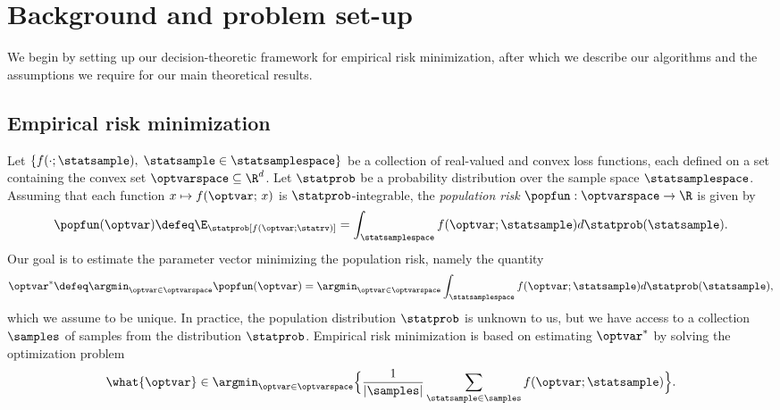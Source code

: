 \documentclass[11pt,twoside]{article}
\theoremstyle{definition}
\newcommand{\MYMIN}[1]{\ensuremath{\Big\{#1 \Big \}}}
\begin{document}




\section{Background and problem set-up}

We begin by setting up our decision-theoretic framework for empirical
risk minimization, after which we describe our algorithms and the
assumptions we require for our main theoretical results.

\subsection{Empirical risk minimization}

Let $\{f(\cdot; \statsample), \; \statsample \in \statsamplespace\}$
be a collection of real-valued and convex loss functions, each defined
on a set containing the convex set $\optvarspace \subseteq \R^d$. Let
$\statprob$ be a probability distribution over the sample space
$\statsamplespace$.  Assuming that each function $x \mapsto f(\optvar;
\, x)$ is $\statprob$-integrable, the \emph{population risk} $\popfun
: \optvarspace \rightarrow \R$ is given by
\begin{equation}
  \label{eqn:objective}
  \popfun(\optvar) \defeq \E_\statprob[f(\optvar; \statrv)] =
  \int_{\statsamplespace} f(\optvar; \statsample) d
  \statprob(\statsample).
\end{equation}
Our goal is to estimate the parameter vector minimizing the population
risk, namely the quantity
\begin{equation}
  \label{eqn:optimal-point}
  \optvar^* \defeq
  \argmin_{\optvar \in \optvarspace} \popfun(\optvar)
  = \argmin_{\optvar \in \optvarspace}
  \int_{\statsamplespace} f(\optvar; \statsample) d\statprob(\statsample),
\end{equation}
which we assume to be unique. In practice, the population distribution
$\statprob$ is unknown to us, but we have access to a collection
$\samples$ of samples from the distribution $\statprob$.  Empirical
risk minimization is based on estimating $\optvar^*$ by solving the
optimization problem
\begin{equation}
  \label{eqn:erm}
  \what{\optvar} \in \argmin_{\optvar \in \optvarspace} \MYMIN{
    \frac{1}{|\samples|} \sum_{\statsample \in \samples} f(\optvar;
    \statsample)}.
\end{equation}
\end{document}
